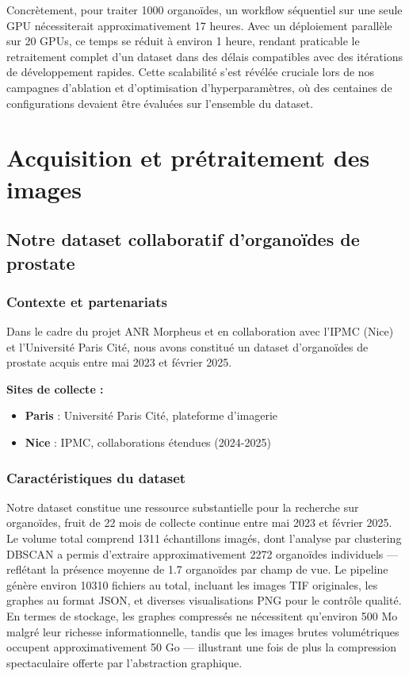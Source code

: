 Concrètement, pour traiter 1000 organoïdes, un workflow séquentiel sur une seule GPU nécessiterait approximativement 17 heures. Avec un déploiement parallèle sur 20 GPUs, ce temps se réduit à environ 1 heure, rendant praticable le retraitement complet d'un dataset dans des délais compatibles avec des itérations de développement rapides. Cette scalabilité s'est révélée cruciale lors de nos campagnes d'ablation et d'optimisation d'hyperparamètres, où des centaines de configurations devaient être évaluées sur l'ensemble du dataset.

\section{Acquisition et prétraitement des images}

\subsection{Notre dataset collaboratif d'organoïdes de prostate}

\subsubsection{Contexte et partenariats}

Dans le cadre du projet ANR Morpheus et en collaboration avec l'IPMC (Nice) et l'Université Paris Cité, nous avons constitué un dataset d'organoïdes de prostate acquis entre mai 2023 et février 2025.

\textbf{Sites de collecte :}
\begin{itemize}
    \item \textbf{Paris} : Université Paris Cité, plateforme d'imagerie
    \item \textbf{Nice} : IPMC, collaborations étendues (2024-2025)
\end{itemize}

\subsubsection{Caractéristiques du dataset}

Notre dataset constitue une ressource substantielle pour la recherche sur organoïdes, fruit de 22 mois de collecte continue entre mai 2023 et février 2025. Le volume total comprend 1311 échantillons imagés, dont l'analyse par clustering DBSCAN a permis d'extraire approximativement 2272 organoïdes individuels — reflétant la présence moyenne de 1.7 organoïdes par champ de vue. Le pipeline génère environ 10310 fichiers au total, incluant les images TIF originales, les graphes au format JSON, et diverses visualisations PNG pour le contrôle qualité. En termes de stockage, les graphes compressés ne nécessitent qu'environ 500 Mo malgré leur richesse informationnelle, tandis que les images brutes volumétriques occupent approximativement 50 Go — illustrant une fois de plus la compression spectaculaire offerte par l'abstraction graphique.


